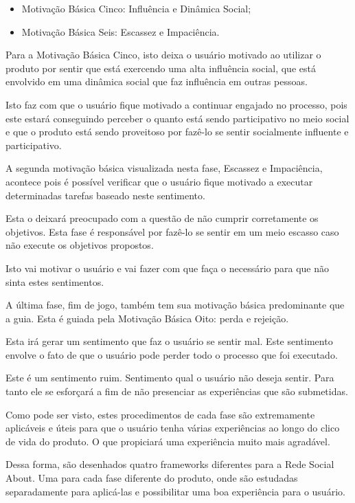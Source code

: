 \begin{itemize}
    \item Motivação Básica Cinco: Influência e Dinâmica Social;
    \item Motivação Básica Seis: Escassez e Impaciência.
\end{itemize}


Para a Motivação Básica Cinco, isto deixa o usuário motivado ao utilizar o produto
por sentir que está exercendo uma alta influência social, que está envolvido em
uma dinâmica social que faz influência em outras pessoas.

Isto faz com que o usuário fique motivado a continuar engajado no processo, pois
este estará conseguindo perceber o quanto está sendo participativo no meio social
e que o produto está sendo proveitoso por fazê-lo se sentir socialmente influente
e participativo.


A segunda motivação básica visualizada nesta fase, Escassez e Impaciência, acontece
pois é possível verificar que o usuário fique motivado a executar determinadas
tarefas baseado neste sentimento.

Esta o deixará preocupado com a questão de não cumprir corretamente os objetivos.
Esta fase é responsável por fazê-lo se sentir em um meio escasso caso não execute
os objetivos propostos.

Isto vai motivar o usuário e vai fazer com que faça o necessário para que não
sinta estes sentimentos.

A última fase, fim de jogo, também tem sua motivação básica predominante que
a guia. Esta é guiada pela Motivação Básica Oito: perda e rejeição.

Esta irá gerar um sentimento que faz o usuário se sentir mal. Este sentimento
envolve o fato de que o usuário pode perder todo o processo que foi executado.



Este é um sentimento ruim. Sentimento qual o usuário não deseja sentir. Para tanto
ele se esforçará a fim de não presenciar as experiências que são submetidas.

Como pode ser visto, estes procedimentos de cada fase são extremamente aplicáveis
e úteis para que o usuário tenha várias experiências ao longo do clico de vida do
produto. O que propiciará uma experiência muito mais agradável.

Dessa forma, são desenhados quatro frameworks diferentes para a Rede Social About.
Uma para cada fase diferente do produto, onde são estudadas separadamente para
aplicá-las e possibilitar uma boa experiência para o usuário.


